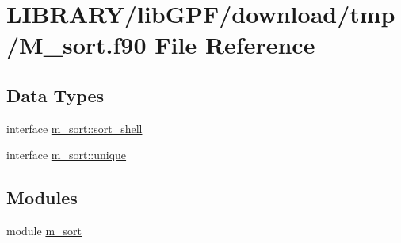 \hypertarget{M__sort_8f90}{}\section{L\+I\+B\+R\+A\+R\+Y/lib\+G\+P\+F/download/tmp/\+M\+\_\+sort.f90 File Reference}
\label{M__sort_8f90}
\subsection*{Data Types}
\begin{DoxyCompactItemize}
\item 
interface \hyperlink{interfacem__sort_1_1sort__shell}{m\+\_\+sort\+::sort\+\_\+shell}
\item 
interface \hyperlink{interfacem__sort_1_1unique}{m\+\_\+sort\+::unique}
\end{DoxyCompactItemize}
\subsection*{Modules}
\begin{DoxyCompactItemize}
\item 
module \hyperlink{namespacem__sort}{m\+\_\+sort}
\end{DoxyCompactItemize}
